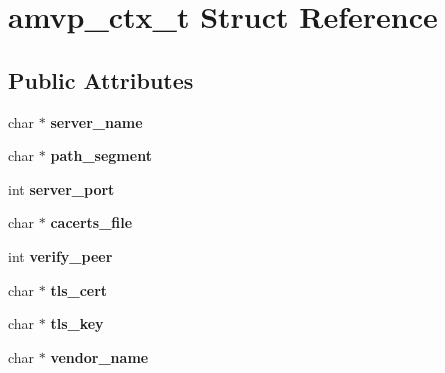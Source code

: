 \hypertarget{structamvp__ctx__t}{\section{amvp\-\_\-ctx\-\_\-t Struct Reference}
\label{structamvp__ctx__t}
}
\subsection*{Public Attributes}
\begin{DoxyCompactItemize}
\item 
\hypertarget{structamvp__ctx__t_ac96121157538ba813dc65407553c0a78}{char $\ast$ {\bfseries server\-\_\-name}}\label{structamvp__ctx__t_ac96121157538ba813dc65407553c0a78}

\item 
\hypertarget{structamvp__ctx__t_af82da6890e65d0742d41b9c57303bf86}{char $\ast$ {\bfseries path\-\_\-segment}}\label{structamvp__ctx__t_af82da6890e65d0742d41b9c57303bf86}

\item 
\hypertarget{structamvp__ctx__t_ad24660d9c5004886cbda2bde8d89c97a}{int {\bfseries server\-\_\-port}}\label{structamvp__ctx__t_ad24660d9c5004886cbda2bde8d89c97a}

\item 
\hypertarget{structamvp__ctx__t_a9e8dd5e3c01ed89eb843b836aeb45f55}{char $\ast$ {\bfseries cacerts\-\_\-file}}\label{structamvp__ctx__t_a9e8dd5e3c01ed89eb843b836aeb45f55}

\item 
\hypertarget{structamvp__ctx__t_add7a911b087fb1ddee104cf2d4163586}{int {\bfseries verify\-\_\-peer}}\label{structamvp__ctx__t_add7a911b087fb1ddee104cf2d4163586}

\item 
\hypertarget{structamvp__ctx__t_acd81835717347b60355dee69475e07f0}{char $\ast$ {\bfseries tls\-\_\-cert}}\label{structamvp__ctx__t_acd81835717347b60355dee69475e07f0}

\item 
\hypertarget{structamvp__ctx__t_afda638c4d057ee7d998bb5cb8ba0f22a}{char $\ast$ {\bfseries tls\-\_\-key}}\label{structamvp__ctx__t_afda638c4d057ee7d998bb5cb8ba0f22a}

\item 
\hypertarget{structamvp__ctx__t_af57d307d87c31c478084b778c872798b}{char $\ast$ {\bfseries vendor\-\_\-name}}\label{structamvp__ctx__t_af57d307d87c31c478084b778c872798b}


\end{DoxyCompactItemize}
